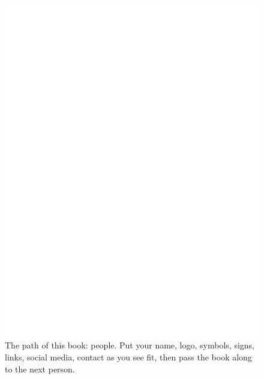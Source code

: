 \documentclass{report}
\begin{document}
 \begin{figure}
	\centering
	\includegraphics[width=5in]{imageserver/uploadimages/image3.png}
	\caption[people]
	{The path of this book: people.  Put your name, logo, symbols, signs, links, social media, contact as you see fit, then pass the book along to the next person.}
\end{figure}
\end{document}
